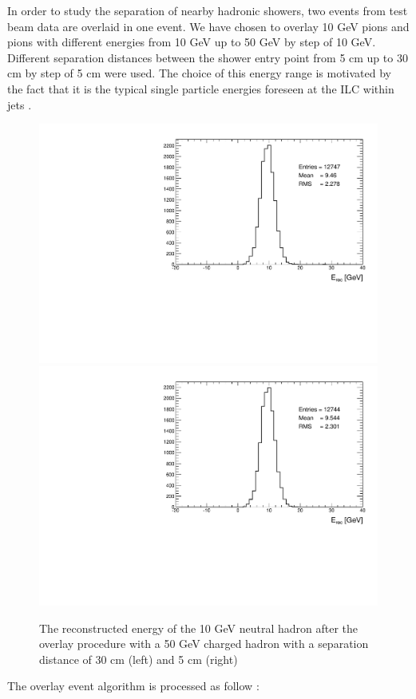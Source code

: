 \documentclass[cits]{JINST}
\begin{document}
In order to study the separation of nearby hadronic showers, two events from test beam data are overlaid in one event. We have chosen to overlay 10 GeV pions and pions with different energies from 10 GeV up to 50 GeV by step of 10 GeV. Different separation distances between the shower entry point from 5 cm up to 30 cm by step of 5 cm were used. The choice of this energy range is motivated by the fact that it is the typical single particle energies foreseen at the ILC within jets \cite{hadron-jets}.

\begin{figure}[!h]
  \begin{center}
    \includegraphics[width=0.47\linewidth]{plots/histo_neutral_mcenergy_ArborPFA_TestBeam_10GeV_n_50GeV_ch_30_cm.pdf}
    \includegraphics[width=0.47\linewidth]{plots/histo_neutral_mcenergy_ArborPFA_TestBeam_10GeV_n_50GeV_ch_5_cm.pdf}
  \end{center}
  \caption{\label{OVERLAY_EVENT_MC_EREC_OVERLAID_HITS} The reconstructed energy of the 10 GeV neutral hadron after the overlay procedure with a 50 GeV charged hadron with a separation distance of 30 cm (left) and 5 cm (right)}
\end{figure}

The overlay event algorithm is processed as follow :
\end{document}
